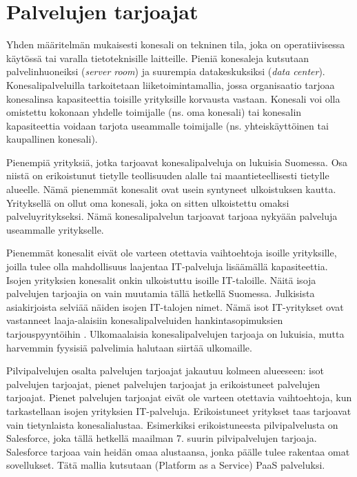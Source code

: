 \section{Palvelujen tarjoajat}
Yhden määritelmän mukaisesti konesali on tekninen tila, joka on operatiivisessa käytössä tai varalla tietoteknisille laitteille. Pieniä konesaleja kutsutaan palvelinhuoneiksi (\emph{server room}) ja suurempia datakeskuksiksi (\emph{data center}). Konesalipalveluilla tarkoitetaan liiketoimintamallia, jossa organisaatio tarjoaa konesalinsa kapasiteettia toisille yrityksille korvausta vastaan. Konesali voi olla omistettu kokonaan yhdelle toimijalle (ns. oma konesali) tai konesalin kapasiteettia voidaan tarjota useammalle toimijalle (ns. yhteiskäyttöinen tai kaupallinen konesali). \citep{itewiki}

Pienempiä yrityksiä, jotka tarjoavat konesalipalveluja on lukuisia Suomessa. Osa niistä on erikoistunut tietylle teollisuuden alalle tai maantieteellisesti tietylle alueelle. Nämä pienemmät konesalit ovat usein syntyneet ulkoistuksen kautta. Yrityksellä on ollut oma konesali, joka on sitten ulkoistettu omaksi palveluyritykseksi. Nämä konesalipalvelun tarjoavat tarjoaa nykyään palveluja useammalle yritykselle. \citep{tnnet} 

Pienemmät konesalit eivät ole varteen otettavia vaihtoehtoja isoille yrityksille, joilla tulee olla mahdollisuus laajentaa IT-palveluja lisäämällä kapasiteettia. Isojen yrityksien konesalit onkin ulkoistuttu isoille IT-taloille. Näitä isoja palvelujen tarjoajia on vain muutamia tällä hetkellä Suomessa. Julkisista asiakirjoista selviää näiden isojen IT-talojen nimet. Nämä isot IT-yritykset ovat vastanneet laaja-alaisiin konesalipalveluiden hankintasopimuksien tarjouspyyntöihin \citep{nurmijarvi}. Ulkomaalaisia konesalipalvelujen tarjoaja on lukuisia, mutta harvemmin fyysisiä palvelimia halutaan siirtää ulkomaille.

Pilvipalvelujen osalta palvelujen tarjoajat jakautuu kolmeen alueeseen: isot palvelujen tarjoajat, pienet palvelujen tarjoajat ja erikoistuneet palvelujen tarjoajat. Pienet palvelujen tarjoajat eivät ole varteen otettavia vaihtoehtoja, kun tarkastellaan isojen yrityksien IT-palveluja. Erikoistuneet yritykset taas tarjoavat vain tietynlaista konesalialustaa. Esimerkiksi erikoistuneesta pilvipalvelusta on Salesforce, joka tällä hetkellä maailman 7. suurin pilvipalvelujen tarjoaja. Salesforce tarjoaa vain heidän omaa alustaansa, jonka päälle tulee rakentaa omat sovellukset. Tätä mallia kutsutaan (Platform as a Service) PaaS palveluksi.\citep{top_cloud}

